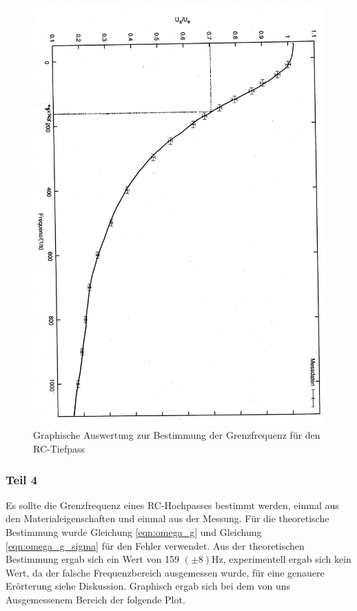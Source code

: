 \documentclass[12pt]{scrartcl}
\begin{document}
\begin{figure}[htbp] 
  \centering
    \includegraphics[scale = 0.5, angle = 90]{teil_3.pdf}
  	\caption[Graphische Auswertung zur Bestimmung der Grenzfrequenz für den RC-Tiefpass]{Graphische Auswertung zur Bestimmung der Grenzfrequenz für den RC-Tiefpass}
  \label{fig:Hochpass}
\end{figure}

\newpage

\subsubsection{Teil 4}
Es sollte die Grenzfrequenz eines RC-Hochpasses bestimmt werden, einmal aus den Materialeigenschaften und einmal aus der Messung. Für die theoretische Bestimmung wurde Gleichung \ref{eqn:omega_g} und Gleichung \ref{eqn:omega_g_sigma} für den Fehler verwendet.
Aus der theoretischen Bestimmung ergab sich ein Wert von 159 $(\pm 8)$Hz, experimentell ergab sich kein Wert, da der falsche Frequenzbereich ausgemessen wurde, für eine genauere Erörterung siehe Diskussion. Graphisch ergab sich bei dem von uns Ausgemessenem Bereich der folgende Plot.
\end{document}

